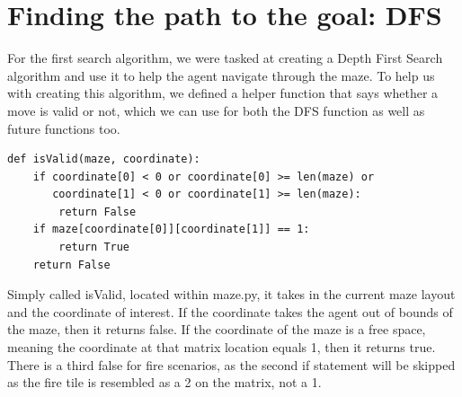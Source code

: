 \documentclass[11pt]{article}
\begin{document}
\section{Finding the path to the goal: DFS}
For the first search algorithm, we were tasked at creating a Depth First Search algorithm and use it to help the agent navigate through the maze. To help us with creating this algorithm, we defined a helper function that says whether a move is valid or not, which we can use for both the DFS function as well as future functions too.
\begin{verbatim}
def isValid(maze, coordinate):
    if coordinate[0] < 0 or coordinate[0] >= len(maze) or
       coordinate[1] < 0 or coordinate[1] >= len(maze):
        return False
    if maze[coordinate[0]][coordinate[1]] == 1:
        return True
    return False
\end{verbatim}
Simply called isValid, located within maze.py, it takes in the current maze layout and the coordinate of interest. If the coordinate takes the agent out of bounds of the maze, then it returns false. If the coordinate of the maze is a free space, meaning the coordinate at that matrix location equals 1, then it returns true. There is a third false for fire scenarios, as the second if statement will be skipped as the fire tile is resembled as a 2 on the matrix, not a 1.
\end{document}
